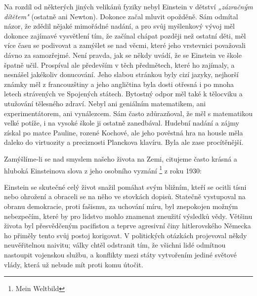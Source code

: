         Na rozdíl od některých jiných velikánů fyziky nebyl Einstein v dětství \emph{„zázračným
        dítětem"} (ostatně ani Newton). Dokonce začal mluvit opožděně. Sám odmítal názor, že zdědil
        nějaké mimořádné nadání, a pro svůj myšlenkový vývoj měl dokonce zajímavé vysvětlení tím, že
        začínal chápat později než ostatní děti, měl více času se podivovat a zamýšlet se nad věcmi,
        které jeho vrstevnici považovali dávno za samozřejmé. Není pravda, jak se někdy uvádí, že se
        Einstein ve škole špatně učil. Prospíval ale především v těch předmětech, které ho zajímaly,
        a nesnášel jakékoliv donucování. Jeho slabou stránkou byly cizí jazyky, nejhorší známky měl
        z francouzštiny a jeho angličtina byla dosti otřesná i po mnoha letech strávených ve
        Spojených státech. Bytostný odpor měl také k tělocviku a utužování tělesného zdraví. Nebyl
        ani geniálním matematikem, ani experimentátorem, ani vynálezcem. Sám často zdůrazňoval, že
        měl s matematikou velké potíže, i na vysoké škole ji ostatně zanedbával. Hudební nadání a
        zájmy získal po matce Pauline, rozené Kochové, ale jeho pověstná hra na housle měla daleko
        do virtuozity a preciznosti Planckova klavíru. Byla ale zase procítěnější.

        Zamýšlíme-li se nad smyslem našeho života na Zemi, citujeme často krásná a hluboká
        Einsteinova slova z jeho osobního vyznání \emph{}\footnote{Mein Weltbild}
        z roku 1930: \emph{}

        Einstein se skutečné celý život snažil pomáhat svým bližním, kteří se ocitli tísni nebo
        ohrožení a obraceli se na něho ve stovkách dopisů. Statečně vystupoval na obranu demokracie,
        proti fašismu, za uchování míru, byl znepokojen možným nebezpečím, které by pro lidstvo
        mohlo znamenat zneužití výsledků vědy. Většinu života byl přesvědčeným pacifistou a teprve
        agresivní činy hitlerovského Německa ho přiměly tento svůj postoj korigovat. V politických
        otázkách projevoval někdy neuvěřitelnou naivitu; války chtěl odstranit tím, že všichni lidé
        odmítnou nastoupit vojenskou službu, a konflikty mezi státy vytvořením jediné světové vlády,
        která už nebude mít proti komu útočit.

